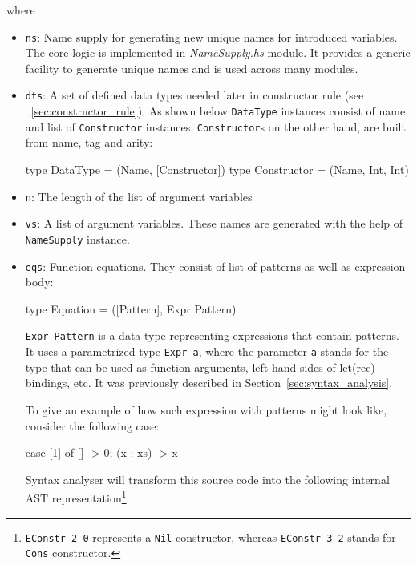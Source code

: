 \documentclass[12pt,a4paper]{report}
\begin{document}
where
\begin{itemize}
  \item \texttt{ns}: Name supply for generating new unique names for
    introduced variables. The core logic is implemented in
    \textit{NameSupply.hs} module. It provides a generic facility to generate
    unique names and is used across many modules.
  \item \texttt{dts}: A set of defined data types needed later in constructor
    rule (see ~\ref{sec:constructor_rule}). As shown below \texttt{DataType}
    instances consist of name and list of \texttt{Constructor} instances.
    \texttt{Constructor}s on the other hand, are built from name, tag and arity:

\vspace*{0.2in}
\begin{code}[style=haskell]
type DataType = (Name, [Constructor])
type Constructor = (Name, Int, Int)
\end{code}

  \item \texttt{n}: The length of the list of argument variables
  \item \texttt{vs}: A list of argument variables. These names are generated
    with the help of \texttt{NameSupply} instance.
  \item \texttt{eqs}: Function equations. They consist of list of patterns as
    well as expression body:

\vspace*{0.2in}
\begin{code}[style=haskell]
type Equation = ([Pattern], Expr Pattern)
\end{code}

\texttt{Expr Pattern} is a data type representing expressions that contain
patterns. It uses a parametrized type \texttt{Expr a}, where the parameter
\texttt{a} stands for the type that can be used as function arguments,
left-hand sides of let(rec) bindings, etc. It was previously described in
Section~\ref{sec:syntax_analysis}.

To give an example of how such expression with patterns might look like,
consider the following case:

\vspace*{0.2in}
\begin{code}[style=haskell]
case [1] of
    []       -> 0;
    (x : xs) -> x
\end{code}

Syntax analyser will transform this source code into the following internal AST
representation\footnote{\texttt{EConstr 2 0} represents a \texttt{Nil}
constructor, whereas \texttt{EConstr 3 2} stands for \texttt{Cons} constructor.}:


\end{itemize}
\end{document}
